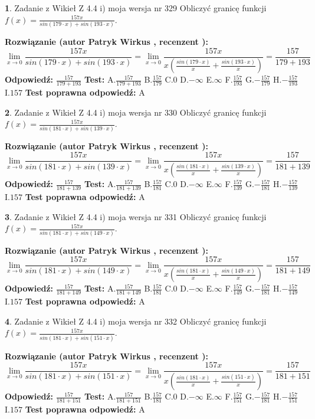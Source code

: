 \documentclass[12pt, a4paper]{article}
\theoremstyle{definition} %
\newtheorem{zad}{}
\newcommand{\zadStart}[1]{\begin{zad}#1\newline}
\newcommand{\zadStop}{\end{zad}}
\newcommand{\rozwStart}[2]{\noindent \textbf{Rozwiązanie (autor #1 , recenzent #2): }\newline}
\newcommand{\rozwStop}{\newline}
\newcommand{\odpStart}{\noindent \textbf{Odpowiedź:}\newline}
\newcommand{\odpStop}{\newline}
\newcommand{\testStart}{\noindent \textbf{Test:}\newline}
\newcommand{\testStop}{\newline}
\newcommand{\kluczStart}{\noindent \textbf{Test poprawna odpowiedź:}\newline}
\newcommand{\kluczStop}{\newline}
\begin{document}
\zadStart{Zadanie z Wikieł Z 4.4 i) moja wersja nr 329}
Obliczyć granicę funkcji $f(x)=\frac{157x}{sin(179\cdot x) +sin(193\cdot x)}$.
\zadStop
\rozwStart{Patryk Wirkus}{}
$$\lim\limits_{x\to 0}\frac{157x}{sin(179\cdot x) +sin(193\cdot x)}=\lim\limits_{x\to 0}\frac{157x}{x(\frac{sin(179\cdot x)}{x}+\frac{sin(193\cdot x)}{x})}=\frac{157}{179+193}$$
\rozwStop
\odpStart
$\frac{157}{179+193}$
\odpStop
\testStart
A.$\frac{157}{179+193}$
B.$\frac{157}{179}$
C.$0$
D.$-\infty$
E.$\infty$
F.$\frac{157}{193}$
G.$-\frac{157}{179}$
H.$-\frac{157}{193}$
I.$157$
\testStop
\kluczStart
A
\kluczStop



\zadStart{Zadanie z Wikieł Z 4.4 i) moja wersja nr 330}
Obliczyć granicę funkcji $f(x)=\frac{157x}{sin(181\cdot x) +sin(139\cdot x)}$.
\zadStop
\rozwStart{Patryk Wirkus}{}
$$\lim\limits_{x\to 0}\frac{157x}{sin(181\cdot x) +sin(139\cdot x)}=\lim\limits_{x\to 0}\frac{157x}{x(\frac{sin(181\cdot x)}{x}+\frac{sin(139\cdot x)}{x})}=\frac{157}{181+139}$$
\rozwStop
\odpStart
$\frac{157}{181+139}$
\odpStop
\testStart
A.$\frac{157}{181+139}$
B.$\frac{157}{181}$
C.$0$
D.$-\infty$
E.$\infty$
F.$\frac{157}{139}$
G.$-\frac{157}{181}$
H.$-\frac{157}{139}$
I.$157$
\testStop
\kluczStart
A
\kluczStop



\zadStart{Zadanie z Wikieł Z 4.4 i) moja wersja nr 331}
Obliczyć granicę funkcji $f(x)=\frac{157x}{sin(181\cdot x) +sin(149\cdot x)}$.
\zadStop
\rozwStart{Patryk Wirkus}{}
$$\lim\limits_{x\to 0}\frac{157x}{sin(181\cdot x) +sin(149\cdot x)}=\lim\limits_{x\to 0}\frac{157x}{x(\frac{sin(181\cdot x)}{x}+\frac{sin(149\cdot x)}{x})}=\frac{157}{181+149}$$
\rozwStop
\odpStart
$\frac{157}{181+149}$
\odpStop
\testStart
A.$\frac{157}{181+149}$
B.$\frac{157}{181}$
C.$0$
D.$-\infty$
E.$\infty$
F.$\frac{157}{149}$
G.$-\frac{157}{181}$
H.$-\frac{157}{149}$
I.$157$
\testStop
\kluczStart
A
\kluczStop



\zadStart{Zadanie z Wikieł Z 4.4 i) moja wersja nr 332}
Obliczyć granicę funkcji $f(x)=\frac{157x}{sin(181\cdot x) +sin(151\cdot x)}$.
\zadStop
\rozwStart{Patryk Wirkus}{}
$$\lim\limits_{x\to 0}\frac{157x}{sin(181\cdot x) +sin(151\cdot x)}=\lim\limits_{x\to 0}\frac{157x}{x(\frac{sin(181\cdot x)}{x}+\frac{sin(151\cdot x)}{x})}=\frac{157}{181+151}$$
\rozwStop
\odpStart
$\frac{157}{181+151}$
\odpStop
\testStart
A.$\frac{157}{181+151}$
B.$\frac{157}{181}$
C.$0$
D.$-\infty$
E.$\infty$
F.$\frac{157}{151}$
G.$-\frac{157}{181}$
H.$-\frac{157}{151}$
I.$157$
\testStop
\kluczStart
A
\kluczStop
\end{document}
